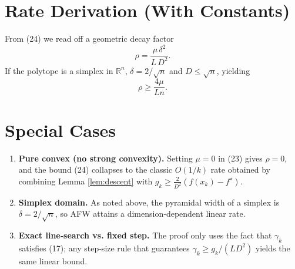 \documentclass{article}
\newcommand{\diam}{D}
\newcommand{\pwidth}{\delta}
\begin{document}
\section*{Rate Derivation (With Constants)}
From (24) we read off a geometric decay factor
\[
\boxed{\rho=\frac{\mu\,\pwidth^{2}}{L\,\diam^{2}} } .
\]
If the polytope is a simplex in $\mathbb{R}^{n}$, $\pwidth=2/\sqrt{n}$ and $\diam\le\sqrt{n}$, yielding
\[
\rho\ge \frac{4\mu}{L n}.
\]

\section*{Special Cases}
\begin{enumerate}
\item \textbf{Pure convex (no strong convexity).} Setting $\mu=0$ in (23) gives $\rho=0$, and the bound (24) collapses to the classic $O(1/k)$ rate obtained by combining Lemma \ref{lem:descent} with $g_k\ge \frac{2}{\diam^{2}}(f(x_k)-f^\star)$.
\item \textbf{Simplex domain.} As noted above, the pyramidal width of a simplex is $\pwidth=2/\sqrt{n}$, so AFW attains a dimension‑dependent linear rate.
\item \textbf{Exact line‑search vs. fixed step.} The proof only uses the fact that $\gamma_k$ satisfies (17); any step‑size rule that guarantees $\gamma_k\ge g_k/(L\diam^{2})$ yields the same linear bound.
\end{enumerate}
\end{document}

